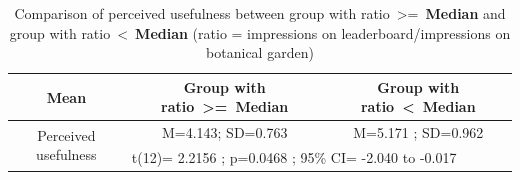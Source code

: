 \begin{table}[h!]
  \begin{center}
    \caption{Comparison of perceived usefulness between group with ratio~\textgreater=~\textbf{Median} and group with ratio~\textless~\textbf{Median} (ratio = impressions on leaderboard/impressions on botanical garden)}
    \label{table:pu_leaderboard_bias}
	\begin{tabular}{|c|c|c|}
		\hline
		Mean &Group with ratio~\textgreater=~\textbf{Median}&Group with ratio~\textless~\textbf{Median}\\
		\hline
		 \multirow{2}{*}{Perceived usefulness}&M=4.143; SD=0.763&M=5.171 	; SD=0.962\\\cline{2-3} 

		 &\multicolumn{2}{|l|}{t(12)= 2.2156 ; p=0.0468 ; 95\% CI= -2.040  to  -0.017} \\
\hline
	\end{tabular}
  \end{center}
\end{table}

